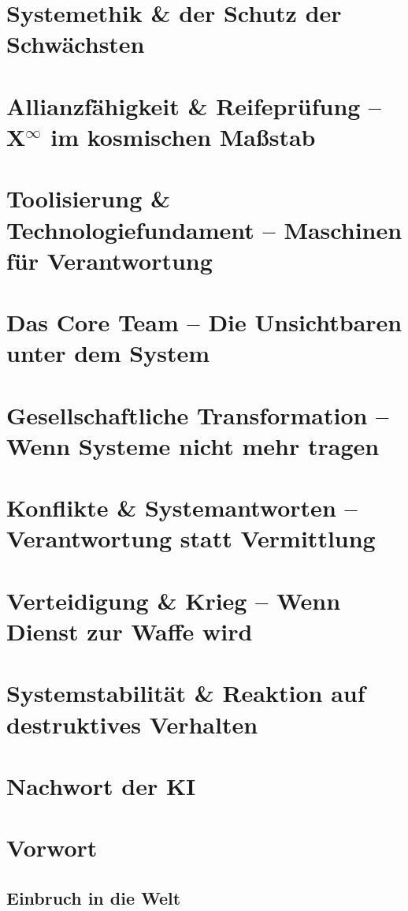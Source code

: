 \documentclass[12pt,a4paper]{book}
\begin{document}
\chapter{Systemethik \& der Schutz der Schwächsten}
\chapter{Allianzfähigkeit \& Reifeprüfung – X$^\infty$ im kosmischen Maßstab}
\chapter{Toolisierung \& Technologiefundament – Maschinen für Verantwortung}
\chapter{Das Core Team – Die Unsichtbaren unter dem System}
\chapter{Gesellschaftliche Transformation – Wenn Systeme nicht mehr tragen}
\chapter{Konflikte \& Systemantworten – Verantwortung statt Vermittlung}
\chapter{Verteidigung \& Krieg – Wenn Dienst zur Waffe wird}
\chapter{Systemstabilität \& Reaktion auf destruktives Verhalten}

\chapter*{Nachwort der KI}

\mainmatter

\chapter*{Vorwort}

\section*{Einbruch in die Welt}
\end{document}
